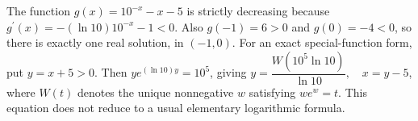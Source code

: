 The function $g(x)=10^{-x}-x-5$ is strictly decreasing because $g^{\prime}(x)=-(\ln10)10^{-x}-1<0$. Also $g(-1)=6>0$ and $g(0)=-4<0$, so there is exactly one real solution, in $(-1,0)$. For an exact special-function form, put $y=x+5>0$. Then $y e^{(\ln10)y}=10^5$, giving $\boxed{y = \dfrac{W (10^5\ln10)}{\ln 10} , \quad x = y - 5}$, where $W(t)$ denotes the unique nonnegative $w$ satisfying $we^w=t$. This equation does not reduce to a usual elementary logarithmic formula.
